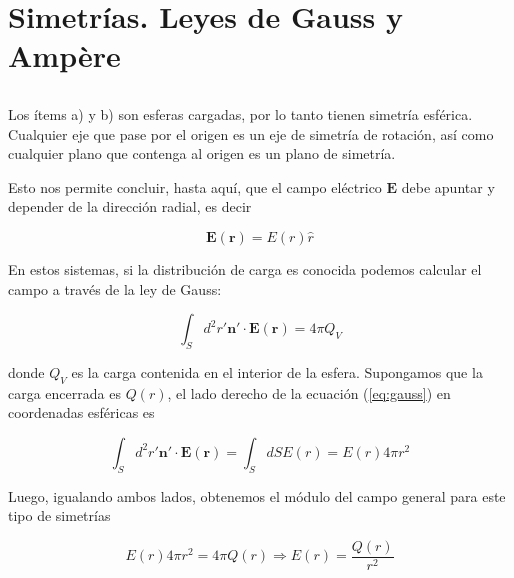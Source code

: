 \section{Simetr\'ias. Leyes de Gauss y Amp\`ere}
\subsection{}
Los \'items a) y b) son esferas cargadas, por lo tanto tienen simetr\'ia esf\'erica. Cualquier eje que pase por el origen es un eje de simetr\'ia de rotaci\'on, as\'i como cualquier plano que contenga al origen es un plano de simetr\'ia.\newline

Esto nos permite concluir, hasta aqu\'i, que el campo el\'ectrico $\mathbf{E}$ debe apuntar y depender de la direcci\'on radial, es decir

$$ \mathbf{E}(\mathbf{r}) = E(r)\hat{r}$$

En estos sistemas, si la distribuci\'on de carga es conocida podemos calcular el campo a trav\'es de la ley de Gauss:

\begin{equation}
    \label{eq:gauss}
    \int_{S} d^{2}r' \textbf{n}' \cdot \mathbf{E(\mathbf{r})} = 4\pi Q_{V}
\end{equation}

donde $Q_{V}$ es la carga contenida en el interior de la esfera. Supongamos que la carga encerrada es $Q(r)$, el lado derecho de la ecuaci\'on (\ref{eq:gauss}) en coordenadas esf\'ericas es

$$\int_{S} d^{2}r' \textbf{n}' \cdot \mathbf{E(\mathbf{r})} = \int_{S}dS E(r) = E(r) 4\pi r^{2}$$

Luego, igualando ambos lados, obtenemos el m\'odulo del campo general para este tipo de simetr\'ias

$$E(r) 4\pi r^{2} = 4\pi Q(r) \Rightarrow E(r) = \frac{Q(r)}{r^{2}}$$


